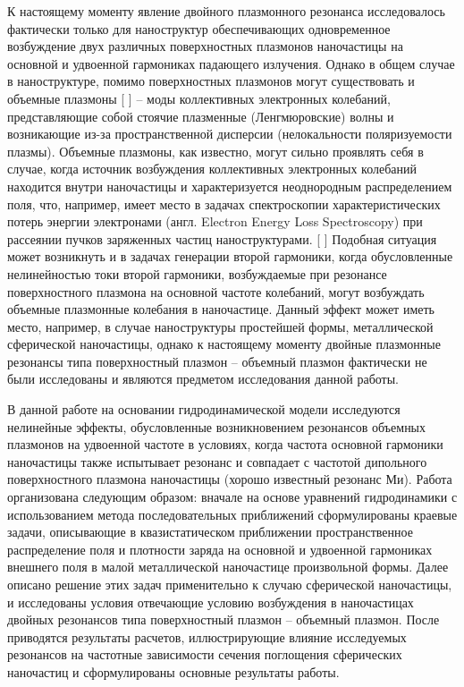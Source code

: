 \documentclass[12pt, a4paper]{article}
\begin{document}
К настоящему моменту явление двойного плазмонного резонанса исследовалось фактически только для наноструктур обеспечивающих одновременное возбуждение двух различных поверхностных плазмонов наночастицы на основной и удвоенной гармониках падающего излучения.
Однако в общем случае в наноструктуре, помимо поверхностных плазмонов могут существовать и объемные плазмоны [
] -- моды коллективных электронных колебаний, представляющие собой стоячие плазменные (Ленгмюровские) волны и возникающие из-за пространственной дисперсии (нелокальности поляризуемости плазмы). Объемные плазмоны, как известно, могут сильно проявлять себя в случае, когда источник возбуждения коллективных электронных колебаний находится внутри наночастицы и характеризуется неоднородным распределением поля, что, например, имеет место в задачах спектроскопии характеристических потерь энергии электронами (англ. Electron Energy Loss Spectroscopy) при рассеянии пучков заряженных частиц наноструктурами.
[
] 
Подобная ситуация может возникнуть и в задачах генерации второй гармоники, когда обусловленные нелинейностью токи второй гармоники, возбуждаемые при резонансе поверхностного плазмона на основной частоте колебаний, могут возбуждать объемные плазмонные колебания в наночастице. Данный эффект может иметь место, например, в случае наноструктуры простейшей формы, металлической сферической наночастицы, однако к настоящему моменту двойные плазмонные резонансы типа поверхностный плазмон -- объемный плазмон фактически не были исследованы и являются предметом исследования данной работы.

В данной работе на основании гидродинамической модели \cite{Haas2011, Boardman1982, Manfredi2021} исследуются нелинейные эффекты, обусловленные возникновением резонансов объемных плазмонов на удвоенной частоте в условиях, когда частота основной гармоники наночастицы также испытывает резонанс и совпадает с частотой дипольного поверхностного плазмона наночастицы (хорошо известный резонанс Ми). Работа организована следующим образом: вначале на основе уравнений гидродинамики с использованием метода последовательных приближений сформулированы краевые задачи, описывающие в квазистатическом приближении пространственное распределение поля и плотности заряда на основной и удвоенной гармониках внешнего поля в малой металлической наночастице произвольной формы. Далее описано решение этих задач применительно к случаю сферической наночастицы, и исследованы условия отвечающие условию возбуждения в наночастицах двойных резонансов типа поверхностный плазмон – объемный плазмон. После приводятся результаты расчетов, иллюстрирующие влияние исследуемых резонансов на частотные зависимости сечения поглощения сферических наночастиц и сформулированы основные результаты работы.
\end{document}
